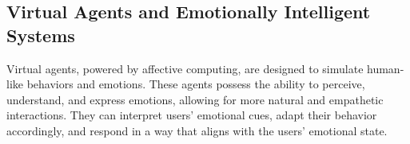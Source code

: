 \subsection{Virtual Agents and Emotionally Intelligent Systems}

Virtual agents, powered by affective computing, are designed to simulate human-like behaviors and emotions. 
These agents possess the ability to perceive, understand, and express emotions, allowing for more natural and empathetic interactions. 
They can interpret users' emotional cues, adapt their behavior accordingly, and respond in a way that aligns with the users' emotional state.    
